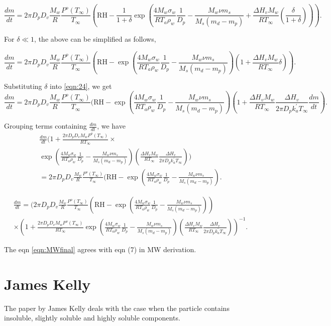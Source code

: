 \documentclass[12pt]{amsart}
\begin{document}
\begin{equation}\label{eqn:23}
\frac{dm}{dt}=2 \pi D_{p} D_{v}  \frac{M_{w}}{R} \frac{P^{o}(T_{\infty})} {T_{\infty}} (\textrm{RH} - \frac{1}{1+\delta} \exp( \frac{4 M_{w}\sigma_{w}}{R T_{a} \rho_w}\frac{1}{D_{p}}-\frac{ M_{w} \nu m_{s}}{M_{s} (m_{d}-m_{p})}+\frac{\Delta H_{v} M_{w}}{R T_{\infty}} (\frac{\delta}{1+\delta}))).
\end{equation}

For $\delta \ll 1$, the above can be simplified as follows,


\begin{equation}\label{eqn:24}
\frac{dm}{dt}=2 \pi D_{p} D_{v}  \frac{M_{w}}{R} \frac{P^{o}(T_{\infty})} {T_{\infty}} (\textrm{RH} - \exp( \frac{4 M_{w}\sigma_{w}}{R T_{a} \rho_w}\frac{1}{D_{p}}-\frac{ M_{w} \nu m_{s}}{M_{s} (m_{d}-m_{p})}) (1+\frac{\Delta H_{v} M_{w}}{R T_{\infty}} \delta)).
\end{equation}


Substituting $\delta$ into \ref{eqn:24}, we get 
\begin{equation}\label{eqn:25}
\frac{dm}{dt}=2 \pi D_{p} D_{v}  \frac{M_{w}}{R} \frac{P^{o}(T_{\infty})} {T_{\infty}} (\textrm{RH} - \exp( \frac{4 M_{w}\sigma_{w}}{R T_{a} \rho_w}\frac{1}{D_{p}}-\frac{ M_{w} \nu m_{s}}{M_{s} (m_{d}-m_{p})}) (1+\frac{\Delta H_{v} M_{w}}{R T_{\infty}} \frac{\Delta H_{v}}{2 \pi D_{p} k^{'}_{a} T_{\infty}} \frac{dm}{dt}).
\end{equation}


Grouping terms containing $\frac{dm}{dt}$, we have  
\begin{eqnarray}\label{eqn:26}
\frac{dm}{dt}(1+\frac{2 \pi D_{p} D_{v} M_{w} P^{o}(T_{\infty})}{R T_{\infty}} \times \\  \nonumber
\exp(\frac{4 M_{w}\sigma_{w}}{R T_{a} \rho_w}\frac{1}{D_{p}}- \frac{ M_{w} \nu m_{s}}{M_{s} (m_{d}-m_{p})})(\frac{\Delta H_{v} M_{w}} {R T_{\infty}}\frac{\Delta H_{v}}{2 \pi D_{p} k^{'}_{a} T_{\infty}})) \\  \nonumber
=2 \pi D_{p} D_{v}  \frac{M_{w}}{R} \frac{P^{o}(T_{\infty})} {T_{\infty}} 
 (\textrm{RH}-\exp( \frac{4 M_{w}\sigma_{w}}{R T_{a} \rho_w} 
\frac{1}{D_{p}}-\frac{ M_{w} \nu m_{s}}{M_{s} (m_{d}-m_{p})}). \nonumber
\end{eqnarray}


\begin{eqnarray}\label{eqn:MWfinal}
\frac{dm}{dt}= (2 \pi D_{p} D_{v}  \frac{M_{w}}{R} \frac{P^{o}(T_{\infty})} {T_{\infty}} 
(\textrm{RH} - \exp( \frac{4 M_{w}\sigma_{w}}{R T_{a} \rho_w} 
\frac{1}{D_{p}}-\frac{ M_{w} \nu m_{s}}{M_{s} (m_{d}-m_{p})})) \\
\times (1+\frac{2 \pi D_{p} D_{v} M_{w} P^{o}(T_{\infty})}{R T_{\infty}} \exp(\frac{4 M_{w}\sigma_{w}}{R T_{a} \rho_w}\frac{1}{D_{p}}-\frac{ M_{w} \nu m_{s}}{M_{s} (m_{d}-m_{p})}) (\frac{\Delta H_{v} M_{w}} {R T_{\infty}}\frac{\Delta H_{v}}{2 \pi D_{p} k^{'}_{a} T_{\infty}}))^{-1}. \nonumber
\end{eqnarray}

The eqn \ref{eqn:MWfinal} agrees with eqn (7) in MW derivation.

\section{James Kelly}

The paper by James Kelly deals with the case when the particle contains insoluble, slightly soluble and  highly soluble components.
\end{document}
